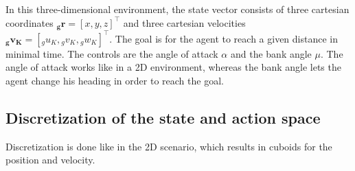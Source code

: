 In this three-dimensional environment, the state vector consists of three cartesian coordinates $\boldsymbol{{}_g r}=[x,y,z]^\top$ and three cartesian velocities $\boldsymbol{{}_g v_K}=[{}_g u_K,{}_g v_K,{}_g w_K]^\top$. The goal is for the agent to reach a given distance in minimal time. The controls are the angle of attack $\alpha$ and the bank angle $\mu$. The angle of attack works like in a 2D environment, whereas the bank angle lets the agent change his heading in order to reach the goal.

\subsection{Discretization of the state and action space}
\label{sec:disc3d}

Discretization is done like in the 2D scenario, which results in cuboids for the position and velocity.